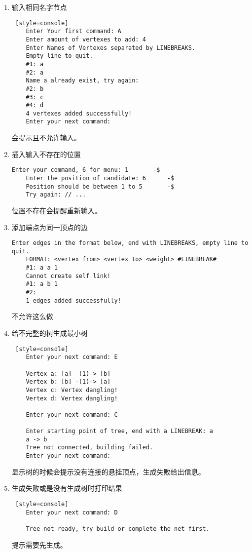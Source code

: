\begin{enumerate}
    \item 输入相同名字节点
\begin{lstlisting} [style=console]
    Enter Your first command: A
    Enter amount of vertexes to add: 4
    Enter Names of Vertexes separated by LINEBREAKS.
    Empty line to quit.
    #1: a
    #2: a
    Name a already exist, try again: 
    #2: b
    #3: c
    #4: d
    4 vertexes added successfully!
    Enter your next command: 
\end{lstlisting}
    会提示且不允许输入。

    \item 插入输入不存在的位置
\begin{lstlisting}[style=console]
    Enter your command, 6 for menu: 1       -$
    Enter the position of candidate: 6      -$
    Position should be between 1 to 5       -$
    Try again: // ...
\end{lstlisting}
    位置不存在会提醒重新输入。

    \item 添加端点为同一顶点的边
\begin{lstlisting}[style=console]
    Enter edges in the format below, end with LINEBREAKS, empty line to quit.
    FORMAT: <vertex from> <vertex to> <weight> #LINEBREAK#
    #1: a a 1
    Cannot create self link!
    #1: a b 1
    #2: 
    1 edges added successfully!
\end{lstlisting}
    不允许这么做

\item 给不完整的树生成最小树
\begin{lstlisting} [style=console]
    Enter your next command: E

    Vertex a: [a] -(1)-> [b]		
    Vertex b: [b] -(1)-> [a]		
    Vertex c: Vertex dangling!
    Vertex d: Vertex dangling!
    
    Enter your next command: C
    
    Enter starting point of tree, end with a LINEBREAK: a
    a -> b
    Tree not connected, building failed.
    Enter your next command: 
\end{lstlisting}
    显示树的时候会提示没有连接的悬挂顶点，生成失败给出信息。

    \item 生成失败或是没有生成树时打印结果
\begin{lstlisting} [style=console]
    Enter your next command: D

    Tree not ready, try build or complete the net first.
\end{lstlisting}
    提示需要先生成。

\end{enumerate}